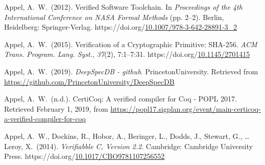 \documentclass[12pt,twoside]{article}
\begin{document}
{\begin{thebibliography}{222}
\mdbibitemlabel{}Appel, A.~W.~(2012). Verified Software Toolchain. In \emph{Proceedings of the 4th International Conference on NASA Formal Methods} (pp. 2–2). Berlin, Heidelberg: Springer-Verlag. https://doi.org/\href{https://dx.doi.org/10.1007/978-3-642-28891-3_2}{10.1007/978-3-642-28891-3\_2}\label{appel_verified_2012}%

\mdbibitemlabel{}Appel, A.~W.~(2015). Verification of a Cryptographic Primitive: SHA-256. \emph{ACM Trans. Program. Lang. Syst.}, \emph{37}(2), 7:1–7:31. https://doi.org/\href{https://dx.doi.org/10.1145/2701415}{10.1145/2701415}\label{appel_verification_2015}%

\mdbibitemlabel{}Appel, A.~W.~(2019). \emph{DeepSpecDB - github}. PrincetonUniversity. Retrieved from \href{https://github.com/PrincetonUniversity/DeepSpecDB}{{\ttfamily https://\hspace{0pt}github.\hspace{0pt}com/\hspace{0pt}PrincetonUniversity/\hspace{0pt}DeepSpecDB}}\label{appel_deepspecdb_2019}%

\mdbibitemlabel{}Appel, A.~W.~(n.d.). CertiCoq: A verified compiler for Coq - POPL 2017. Retrieved February 1, 2019, from \href{https://popl17.sigplan.org/event/main-certicoq-a-verified-compiler-for-coq}{{\ttfamily https://\hspace{0pt}popl17.\hspace{0pt}sigplan.\hspace{0pt}org/\hspace{0pt}event/\hspace{0pt}main-\hspace{0pt}certicoq-\hspace{0pt}a-\hspace{0pt}verified-\hspace{0pt}compiler-\hspace{0pt}for-\hspace{0pt}coq}}\label{appel_certicoq:_nodate}%

\mdbibitemlabel{}Appel, A.~W., Dockins, R., Hobor, A., Beringer, L., Dodds, J., Stewart, G., … Leroy, X.~(2014). \emph{Verifiabble C, Version 2.2}. Cambridge: Cambridge University Press. https://doi.org/\href{https://dx.doi.org/10.1017/CBO9781107256552}{10.1017/CBO9781107256552}\label{appel_verifiabble_2014}%


\end{thebibliography}}
\end{document}
